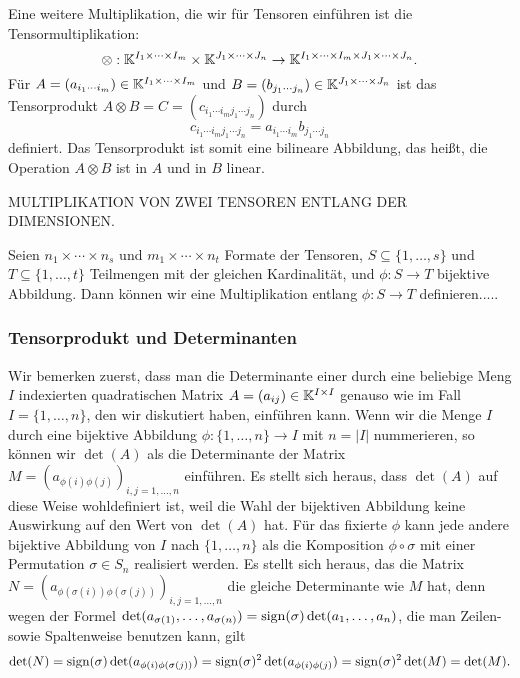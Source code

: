 	Eine weitere Multiplikation, die wir für Tensoren einführen ist die Tensormultiplikation: 
	\[
	\otimes : \mathbb K^{I_1 \times \cdots \times I_m} \times \mathbb K^{J_1 \times \cdots \times  J_n} \to \mathbb K^{I_1 \times \cdots \times I_m \times J_1 \times \cdots \times J_n}. 
	\]
	Für $A = (a_{i_1\cdots i_m} ) \in \mathbb K^{I_1 \times \cdots \times I_m}$ und 
	$B = (b_{j_1 \cdots j_n}) \in \mathbb K^{J_1 \times \cdots \times J_n}$ ist das Tensorprodukt $A \otimes B  =  C = (c_{i_1 \cdots i_m j_1 \cdots j_n})$ durch 
	\[
	c_{i_1 \cdots i_m j_1 \cdots j_n} = a_{i_1 \cdots i_m} b_{j_1 \cdots j_n}
	\]
	definiert. Das Tensorprodukt ist somit eine bilineare Abbildung, das heißt, die Operation $A \otimes B$ ist in $A$ und in $B$ linear. 
	
	
	MULTIPLIKATION VON ZWEI TENSOREN ENTLANG DER DIMENSIONEN. 
	
	Seien $n_1 \times \cdots \times n_s$ und $m_1 \times \cdots \times n_t$ Formate der Tensoren, $S \subseteq \{1,\ldots, s\}$ und $T \subseteq \{1,\ldots, t\}$ Teilmengen mit der gleichen Kardinalität, und $\phi : S \to T$ bijektive Abbildung. Dann können wir eine Multiplikation entlang $\phi : S \to T$ definieren..... 
	
	\subsubsection{Tensorprodukt und Determinanten} 
	
	Wir bemerken zuerst, dass man die Determinante einer durch eine beliebige Meng $I$ indexierten quadratischen Matrix $A = (a_{ij}) \in \mathbb K^{I \times I}$ genauso wie im Fall $I = \{1,\ldots, n\}$, den wir diskutiert haben, einführen kann. Wenn wir die Menge $I$ durch eine bijektive Abbildung $ \phi :  \{1,\ldots,n\} \to I$ mit $n = |I|$ nummerieren, so können wir $\det(A)$ als die Determinante der Matrix $M = ( a_{\phi(i) \phi(j)} )_{i,j =1,\ldots, n}$ einführen. Es stellt sich heraus, dass $\det(A)$ auf diese Weise wohldefiniert ist, weil die Wahl der bijektiven Abbildung keine Auswirkung auf den Wert von $\det(A)$ hat. Für das fixierte $\phi$ kann jede andere bijektive Abbildung von $I$ nach $\{1,\ldots,n\}$ als die Komposition $\phi \circ \sigma$ mit einer Permutation $\sigma \in S_n$ realisiert werden. Es stellt sich heraus, das die Matrix $N = ( a_{\phi(\sigma(i)) \phi(\sigma(j))} )_{i,j=1,\ldots,n}$ die gleiche Determinante wie $M$ hat, denn wegen der Formel $\det(a_{\sigma(1)},\ldots,a_{\sigma(n)}) = \operatorname{sign}(\sigma) \det(a_1,\ldots,a_n)$, die man Zeilen- sowie Spaltenweise benutzen kann, gilt 
	\[
	\det(N) = \operatorname{sign}(\sigma) \det ( a_{\phi(i) \phi(\sigma(j))} ) = \operatorname{sign}(\sigma)^2 
	\det( a_{\phi(i) \phi(j)} ) = \operatorname{sign}(\sigma)^2 \det(M) = \det(M). 
	\] 
	
